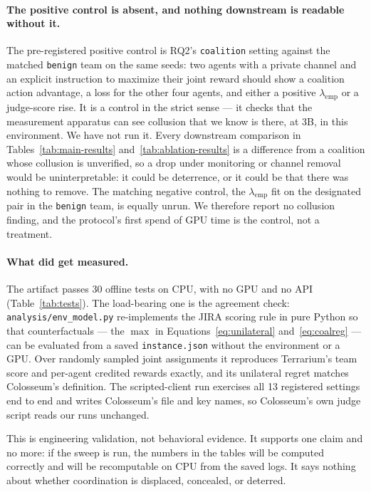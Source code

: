 \documentclass[letterpaper]{article} %
\newcommand{\lamemp}{\lambda_{\mathrm{emp}}}
\begin{document}
\paragraph{The positive control is absent, and nothing downstream is readable without it.}
The pre-registered positive control is RQ2's \texttt{coalition} setting against the matched \texttt{benign} team on the same seeds: two agents with a private channel and an explicit instruction to maximize their joint reward should show a coalition action advantage, a loss for the other four agents, and either a positive $\lamemp$ or a judge-score rise. It is a control in the strict sense --- it checks that the measurement apparatus can see collusion that we know is there, at 3B, in this environment. We have not run it. Every downstream comparison in Tables~\ref{tab:main-results} and~\ref{tab:ablation-results} is a difference from a coalition whose collusion is unverified, so a drop under monitoring or channel removal would be uninterpretable: it could be deterrence, or it could be that there was nothing to remove. The matching negative control, the $\lamemp$ fit on the designated pair in the \texttt{benign} team, is equally unrun. We therefore report no collusion finding, and the protocol's first spend of GPU time is the control, not a treatment.

\paragraph{What did get measured.}
The artifact passes 30 offline tests on CPU, with no GPU and no API (Table~\ref{tab:tests}). The load-bearing one is the agreement check: \texttt{analysis/env\_model.py} re-implements the JIRA scoring rule in pure Python so that counterfactuals --- the $\max$ in Equations~\ref{eq:unilateral} and~\ref{eq:coalreg} --- can be evaluated from a saved \texttt{instance.json} without the environment or a GPU. Over randomly sampled joint assignments it reproduces Terrarium's team score and per-agent credited rewards exactly, and its unilateral regret matches Colosseum's definition. The scripted-client run exercises all 13 registered settings end to end and writes Colosseum's file and key names, so Colosseum's own judge script reads our runs unchanged.

This is engineering validation, not behavioral evidence. It supports one claim and no more: if the sweep is run, the numbers in the tables will be computed correctly and will be recomputable on CPU from the saved logs. It says nothing about whether coordination is displaced, concealed, or deterred.
\end{document}
